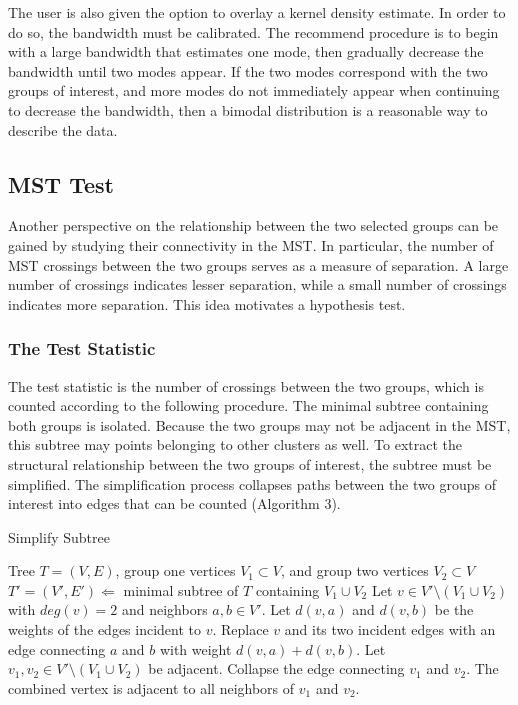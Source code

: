 \documentclass{article}
\begin{document}
{The user is also given the option to overlay a kernel density estimate. In order to do so, the bandwidth must be calibrated. The recommend procedure is to begin with a large bandwidth that estimates one mode, then gradually decrease the bandwidth until two modes appear. If the two modes correspond with the two groups of interest, and more modes do not immediately appear when continuing to decrease the bandwidth, then a bimodal distribution is a reasonable way to describe the data.

\subsection{MST Test}
Another perspective on the relationship between the two selected groups can be gained by studying their connectivity in the MST. In particular, the number of MST crossings between the two groups serves as a measure of separation. A large number of crossings indicates lesser separation, while a small number of crossings indicates more separation. This idea motivates a hypothesis test.

\subsubsection{The Test Statistic}
The test statistic is the number of crossings between the two groups, which is counted according to the following procedure. The minimal subtree containing both groups is isolated. Because the two groups may not be adjacent in the MST, this subtree may points belonging to other clusters as well. To extract the structural relationship between the two groups of interest, the subtree must be simplified. The simplification process collapses paths between the two groups of interest into edges that can be counted (Algorithm 3).

\begin{algorithm}[t]
\caption{Simplify Subtree}\label{algo3}
\begin{algorithmic}[3]
\Require Tree $T = (V,E)$, group one vertices $V_1 \subset V$, and group two vertices $V_2 \subset V$
\State $T' = (V', E') \Leftarrow$ minimal subtree of $T$ containing $V_1 \cup V_2$
\Repeat
	\State Let $v \in V' \setminus (V_1 \cup V_2)$ with $deg(v) = 2$ and neighbors $a, b \in V'$. Let $d(v, a)$ and $d(v, b)$ be the weights of the edges incident to $v$.
	\State Replace $v$ and its two incident edges with an edge connecting $a$ and $b$ with weight $d(v, a) + d(v, b)$.
\Repeat
	\State Let $v_1, v_2 \in V' \setminus (V_1 \cup V_2)$ be adjacent.
	\State Collapse the edge connecting $v_1$ and $v_2$. The combined vertex is adjacent to all neighbors of $v_1$ and $v_2$.
\end{algorithmic}
\end{algorithm}

}
\end{document}
